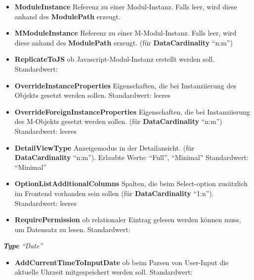 \begin{itemize}
\begin{itemize}
\begin{itemize}
                                \item \textbf{ModuleInstance}\superscript{*}  Referenz zu einer Modul-Instanz. Falls leer, wird diese anhand des \textbf{ModulePath} erzeugt.
                                \item \textbf{MModuleInstance}\superscript{*}  Referenz zu einer M-Modul-Instanz. Falls leer, wird diese anhand des \textbf{ModulePath} erzeugt. (für \textbf{DataCardinality} ``n:m'')
                                \item \textbf{ReplicateToJS}\superscript{*}  ob Javascript-Modul-Instanz erstellt werden soll. Standardwert: 
                                \item \textbf{OverrideInstanceProperties}\superscript{*}  Eigenschaften, die bei Instanziierung des Objekts gesetzt werden sollen. Standardwert: leeres 
                                \item \textbf{OverrideForeignInstanceProperties}\superscript{*}  Eigenschaften, die bei Instanziierung des M-Objekts gesetzt werden sollen. (für \textbf{DataCardinality} ``n:m'') Standardwert: leeres 
                                \item \textbf{DetailViewType}\superscript{*}  Anzeigemodus in der Detailansicht. (für \textbf{DataCardinality} ``n:m''). Erlaubte Werte: ``Full'', ``Minimal'' Standardwert: ``Minimal''
                                \item \textbf{OptionListAdditionalColumns}\superscript{*}  Spalten, die beim Select-option zusätzlich im Frontend vorhanden sein sollen (für \textbf{DataCardinality} ``1:n''). Standardwert: leeres 
                                \item \textbf{RequirePermission}  ob relationaler Eintrag gelesen werden können muss, um Datensatz zu lesen. Standardwert: 
                            \end{itemize}

                            \-\hspace{2mm}\textit{\textbf{Type} ``Date''}
                            \begin{itemize}
                                \item \textbf{AddCurrentTimeToInputDate}\superscript{*}  ob beim Parsen von User-Input die aktuelle Uhrzeit mitgespeichert werden soll. Standardwert: 
                            \end{itemize}


\end{itemize}
\end{itemize}
